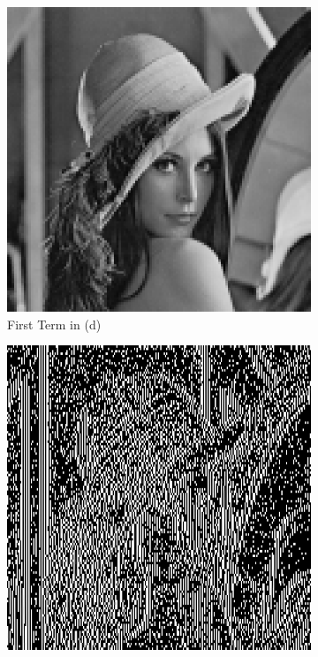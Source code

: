 \begin{figure}[H]
    \centering
    \caption{Result Images of (d)}
    \begin{subfigure}[b]{0.45\textwidth}
        \centering
        \includegraphics[width=\textwidth]{problem3/dTerm1.bmp}
        \caption{First Term in (d)}
    \end{subfigure}
    \hfill
    \begin{subfigure}[b]{0.45\textwidth}
        \centering
        \includegraphics[width=\textwidth]{problem3/dTerm2.bmp}

\end{subfigure}
\end{figure}
